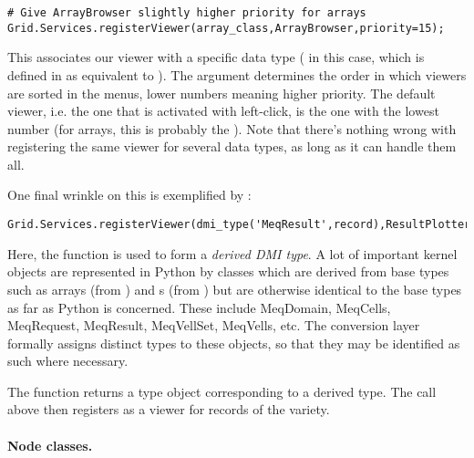 \documentclass[12pt,twoside]{book}
\begin{document}
\begin{verbatim}  
# Give ArrayBrowser slightly higher priority for arrays
Grid.Services.registerViewer(array_class,ArrayBrowser,priority=15);
\end{verbatim}

  This associates our viewer with a specific data type ( in
  this case, which is defined in  as equivalent to
  ). The  argument determines the order in which
  viewers are sorted in the menus, lower numbers meaning higher priority. The
  default viewer, i.e. the one that is activated with left-click, is the one
  with the lowest number (for arrays, this is probably the ).
  Note that there's nothing wrong with registering the same viewer for several
  data types, as long as it can handle them all. 

  One final wrinkle on this is exemplified by :
  
\begin{verbatim}  
Grid.Services.registerViewer(dmi_type('MeqResult',record),ResultPlotter,priority=10)
\end{verbatim}

  Here, the  function is used  to form a {\em derived
  DMI type}. A lot of important kernel objects are represented in Python by
  classes which are derived from base types such as arrays (from )
  and s (from ) but are otherwise identical to the base
  types as far as Python is concerned. These include MeqDomain, MeqCells,
  MeqRequest, MeqResult, MeqVellSet, MeqVells, etc. The conversion layer
  formally assigns distinct types to these objects, so that they may be
  identified as such where necessary. 

  The  function returns a type object corresponding to a derived
  type. The call above then registers  as a viewer for records
  of the  variety.

  \paragraph{Node classes.} 
  
\end{document}
